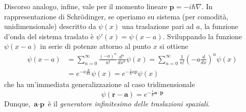 Discorso analogo, infine, vale per il momento lineare $\textbf{p}=-i\hbar\nabla$. In rappresentazione di Schr\"odinger, se operiamo su sistema (per comodità, unidimensionale) descritto da $\psi(x)$ una traslazione pari ad $a$, la funzione d'onda del sistema traslato è $\psi'(x)=\psi(x-a)$. Sviluppando la funzione $\psi(x-a)$ in serie di potenze attorno al punto $x$ si ottiene
\begin{equation}\begin{split}
\psi(x-a)&=\sum_{n=0}^{\infty}{\frac{(-a)^n}{n!}\frac{d^n}{dx^n}}\psi(x)=\sum_{n=0}^{\infty}{\frac{1}{n!}\left(-a\frac{d}{dx}\right)^n}\psi(x) \\
&=e^{-a\frac{d}{dx}}\psi(x)=e^{-\frac{i}{\hbar}ap}\psi(x)
\end{split}\end{equation}
che ha un'immediata generalizzazione al caso tridimensionale
\begin{equation}
\psi(\textbf{r}-\textbf{a})=e^{-\frac{i}{\hbar}\textbf{a}\cdot\textbf{p}}
\end{equation}
Dunque, $\textbf{a}\cdot\textbf{p}$ è il \textit{generatore infinitesimo delle traslazioni spaziali}.

